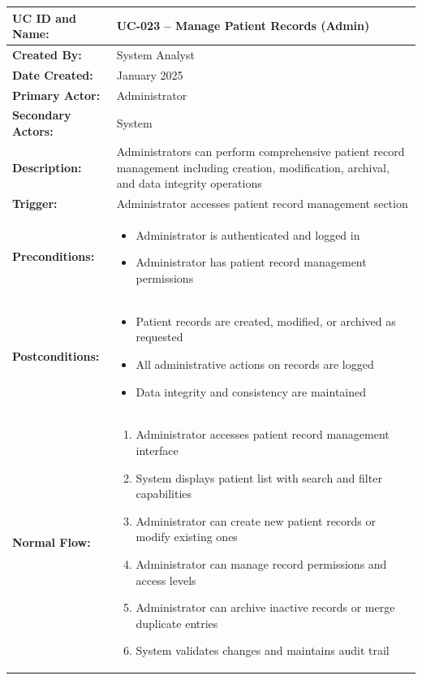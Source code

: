 \documentclass[12pt,a4paper]{article}
\begin{document}
\renewcommand{\arraystretch}{1.5}
\begin{longtable}{|p{4.5cm}|p{10.5cm}|}
\hline
\textbf{UC ID and Name:} & UC-023 – Manage Patient Records (Admin) \\
\hline
\textbf{Created By:} & System Analyst \\
\hline
\textbf{Date Created:} & January 2025 \\
\hline
\textbf{Primary Actor:} & Administrator \\
\hline
\textbf{Secondary Actors:} & System \\
\hline
\textbf{Description:} & Administrators can perform comprehensive patient record management including creation, modification, archival, and data integrity operations \\
\hline
\textbf{Trigger:} & Administrator accesses patient record management section \\
\hline
\textbf{Preconditions:} &
\begin{itemize}
  \item Administrator is authenticated and logged in
  \item Administrator has patient record management permissions
\end{itemize} \\
\hline
\textbf{Postconditions:} &
\begin{itemize}
  \item Patient records are created, modified, or archived as requested
  \item All administrative actions on records are logged
  \item Data integrity and consistency are maintained
\end{itemize} \\
\hline
\textbf{Normal Flow:} &
\begin{enumerate}
  \item Administrator accesses patient record management interface
  \item System displays patient list with search and filter capabilities
  \item Administrator can create new patient records or modify existing ones
  \item Administrator can manage record permissions and access levels
  \item Administrator can archive inactive records or merge duplicate entries
  \item System validates changes and maintains audit trail
\end{enumerate} \\

\end{longtable}
\end{document}

